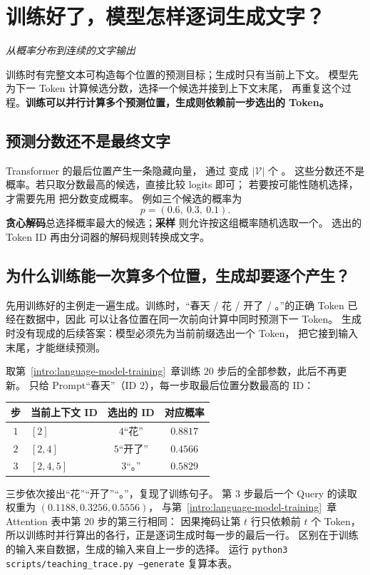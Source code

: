 \chapterrule
\section{训练好了，模型怎样逐词生成文字？}
\label{intro:autoregressive-generation}

\begin{idea}
\noindent\emph{从概率分布到连续的文字输出}\par

训练时有完整文本可构造每个位置的预测目标；生成时只有当前上下文。
模型先为下一 Token 计算候选分数，选择一个候选并接到上下文末尾，
再重复这个过程。\textbf{训练可以并行计算多个预测位置，生成则依赖前一步选出的 Token。}
\end{idea}

\subsection{预测分数还不是最终文字}

Transformer 的最后位置产生一条隐藏向量，
通过  变成 $|\mathcal V|$ 个 。
这些分数还不是概率。若只取分数最高的候选，直接比较 logits 即可；
若要按可能性随机选择，才需要先用  把分数变成概率。
例如三个候选的概率为
\[
p=(0.6,\ 0.3,\ 0.1).
\]
\textbf{贪心解码}总选择概率最大的候选；\textbf{采样}
则允许按这组概率随机选取一个。
选出的 Token ID 再由分词器的解码规则转换成文字。

\subsection{为什么训练能一次算多个位置，生成却要逐个产生？}
\label{concept:autoregressive}

先用训练好的主例走一遍生成。训练时，“春天 / 花 / 开了 / 。”的正确 Token
已经在数据中，因此  可以让各位置在同一次前向计算中同时预测下一 Token。
生成时没有现成的后续答案：模型必须先为当前前缀选出一个 Token，
把它接到输入末尾，才能继续预测。

取第~\ref*{intro:language-model-training}~章训练 $20$ 步后的全部参数，此后不再更新。
只给 Prompt“春天”（ID $2$），每一步取最后位置分数最高的 ID：
\begin{center}\small
{}
\begin{tabular}{@{}clcc@{}}\toprule
步 & 当前上下文 ID & 选出的 ID & 对应概率\\\midrule
$1$ & $[2]$ & $4$“花” & $0.8817$\\
$2$ & $[2,4]$ & $5$“开了” & $0.4566$\\
$3$ & $[2,4,5]$ & $3$“。” & $0.5829$\\\bottomrule
\end{tabular}
\end{center}
三步依次接出“花”“开了”“。”，复现了训练句子。
第 $3$ 步最后一个 Query 的读取权重为 $(0.1188,0.3256,0.5556)$，
与第~\ref*{intro:language-model-training}~章 Attention 表中第 $20$ 步的第三行相同：
因果掩码让第 $t$ 行只依赖前 $t$ 个 Token，
所以训练时并行算出的各行，正是逐词生成时每一步的最后一行。
区别在于训练的输入来自数据，生成的输入来自上一步的选择。
运行 \texttt{python3 scripts/teaching\_trace.py --generate} 复算本表。

